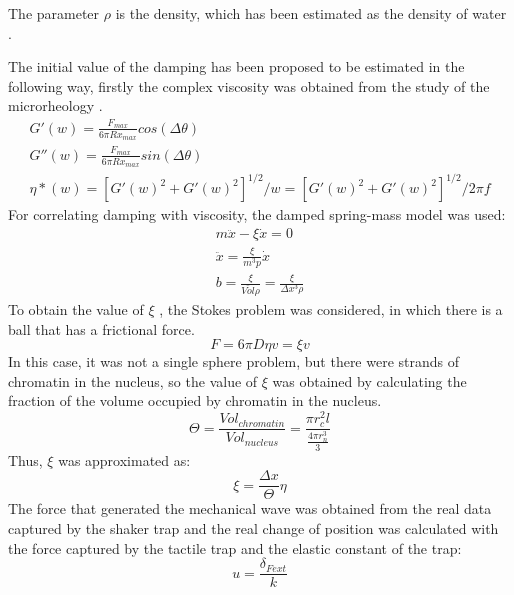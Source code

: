 \documentclass[12pt, a4paper]{article} %
\begin{document}
The parameter $\rho$ is the density, which has been estimated as the density of water \cite{patterson1994measurement}. 

The initial value of the damping has been proposed to be estimated in the following way, firstly the complex viscosity was obtained from the study of the microrheology \cite{el2008measuring, robertson2018optical}. 
\begin{equation} \label{eqn:microreology}
	\begin{array}{ l }
		
		G'(w) = \frac{F_{max}}{6\pi R x_{max}} cos(\Delta \theta) \\
		G''(w) = \frac{F_{max}}{6\pi R x_{max}} sin(\Delta \theta) \\
		\eta *(w) = [G'(w)^{2}+G'(w)^{2}]^{1/2}/w = [G'(w)^{2}+G'(w)^{2}]^{1/2}/2\pi f
		
	\end{array}
\end{equation}
For correlating damping with viscosity, the damped spring-mass model was used:
\begin{equation} \label{eqn:modelo_masa_resorte}
	\begin{array}{ l }
		
		m\ddot{x} - \xi \dot{x} = 0 \\
		\ddot{x} = \frac{\xi}{m^{3}p}\dot{x} \\
		b = \frac{\xi}{\bar{Vol} \rho} = \frac{\xi}{\Delta x^{3} \rho}
		
	\end{array}
\end{equation}
To obtain the value of $\xi$ , the Stokes problem was considered, in which there is a ball that has a frictional force.
\begin{equation} \label{eqn:stokes}
	F = 6\pi D \eta v = \xi v
\end{equation}
In this case, it was not a single sphere problem, but there were strands of chromatin in the nucleus, so the value of $\xi$ was obtained by calculating the fraction of the volume occupied by chromatin in the nucleus.
\begin{equation} \label{eqn:frac_nucl_chro}
	\Theta = \frac{Vol_{chromatin}}{Vol_{nucleus}} = \frac{\pi r_{c}^{2} l}{\frac{4\pi r_{n}^{3}}{3}}
\end{equation}
Thus, $\xi$ was approximated as:
\begin{equation} \label{eqn:xi_approx}
	\xi = \frac{\Delta x}{\Theta} \eta
\end{equation}
The force that generated the mechanical wave was obtained from the real data captured by the shaker trap and the real change of position was calculated with the force captured by the tactile trap and the elastic constant of the trap:
\begin{equation} \label{eqn:real_desp}
	u = \frac{\delta_{Fext}}{k}
\end{equation}
\newpage
\setlength{\parskip}{0mm}
\end{document}

